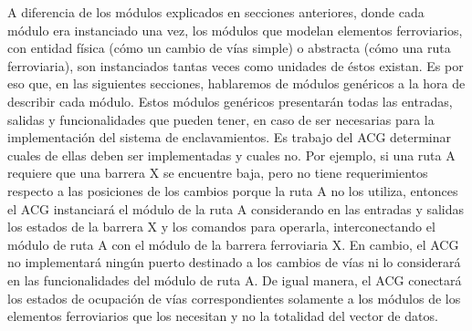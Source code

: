 	A diferencia de los módulos explicados en secciones anteriores, donde cada módulo era instanciado una vez, los módulos que modelan elementos ferroviarios, con entidad física (cómo un cambio de vías simple) o abstracta (cómo una ruta ferroviaria), son instanciados tantas veces como unidades de éstos existan. Es por eso que, en las siguientes secciones, hablaremos de módulos genéricos a la hora de describir cada módulo. Estos módulos genéricos presentarán todas las entradas, salidas y funcionalidades que pueden tener, en caso de ser necesarias para la implementación del sistema de enclavamientos. Es trabajo del ACG determinar cuales de ellas deben ser implementadas y cuales no. Por ejemplo, si una ruta A requiere que una barrera X se encuentre baja, pero no tiene requerimientos respecto a las posiciones de los cambios porque la ruta A no los utiliza, entonces el ACG instanciará el módulo de la ruta A considerando en las entradas y salidas los estados de la barrera X y los comandos para operarla, interconectando el módulo de ruta A con el módulo de la barrera ferroviaria X. En cambio, el ACG no implementará ningún puerto destinado a los cambios de vías ni lo considerará en las funcionalidades del módulo de ruta A. De igual manera, el ACG conectará los estados de ocupación de vías correspondientes solamente a los módulos de los elementos ferroviarios que los necesitan y no la totalidad del vector de datos.
	
	
	
	
	
	
	
	